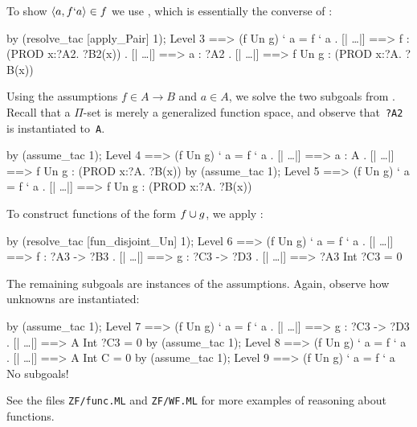 To show $\langle a,f`a\rangle\in f$ we use , which is
essentially the converse of :
\begin{ttbox}
by (resolve_tac [apply_Pair] 1);
{\out Level 3}
{\out [| \ldots |] ==> (f Un g) ` a = f ` a}
{. [| \ldots |] ==> f : (PROD x:?A2. ?B2(x))}
{. [| \ldots |] ==> a : ?A2}
{. [| \ldots |] ==> f Un g : (PROD x:?A. ?B(x))}
\end{ttbox}
Using the assumptions $f\in A\to B$ and $a\in A$, we solve the two subgoals
from .  Recall that a $\Pi$-set is merely a generalized
function space, and observe that~{\tt?A2} is instantiated to~\texttt{A}.
\begin{ttbox}
by (assume_tac 1);
{\out Level 4}
{\out [| \ldots |] ==> (f Un g) ` a = f ` a}
{. [| \ldots |] ==> a : A}
{. [| \ldots |] ==> f Un g : (PROD x:?A. ?B(x))}
by (assume_tac 1);
{\out Level 5}
{\out [| \ldots |] ==> (f Un g) ` a = f ` a}
{. [| \ldots |] ==> f Un g : (PROD x:?A. ?B(x))}
\end{ttbox}
To construct functions of the form $f\cup g$, we apply
:
\begin{ttbox}
by (resolve_tac [fun_disjoint_Un] 1);
{\out Level 6}
{\out [| \ldots |] ==> (f Un g) ` a = f ` a}
{. [| \ldots |] ==> f : ?A3 -> ?B3}
{. [| \ldots |] ==> g : ?C3 -> ?D3}
{. [| \ldots |] ==> ?A3 Int ?C3 = 0}
\end{ttbox}
The remaining subgoals are instances of the assumptions.  Again, observe how
unknowns are instantiated:
\begin{ttbox}
by (assume_tac 1);
{\out Level 7}
{\out [| \ldots |] ==> (f Un g) ` a = f ` a}
{. [| \ldots |] ==> g : ?C3 -> ?D3}
{. [| \ldots |] ==> A Int ?C3 = 0}
by (assume_tac 1);
{\out Level 8}
{\out [| \ldots |] ==> (f Un g) ` a = f ` a}
{. [| \ldots |] ==> A Int C = 0}
by (assume_tac 1);
{\out Level 9}
{\out [| \ldots |] ==> (f Un g) ` a = f ` a}
{\out No subgoals!}
\end{ttbox}
See the files \texttt{ZF/func.ML} and \texttt{ZF/WF.ML} for more
examples of reasoning about functions.

